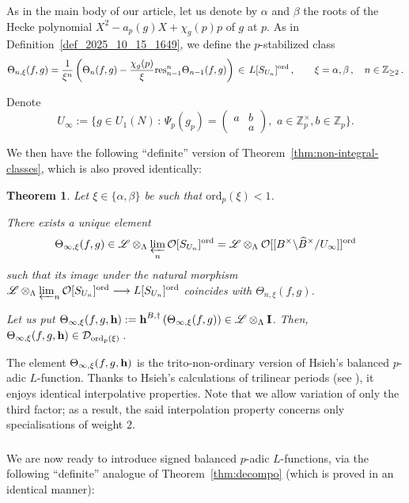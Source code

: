 \documentclass{amsart}
\numberwithin{equation}{section}
\newtheorem{theorem}{Theorem}[section]
\newcommand{\Zp}{\mathbb{Z}_p}
\newcommand{\ZZ}{\mathbb{Z}}
\newcommand{\ord}{\mathrm{ord}}
\newcommand{\cO}{\mathcal{O}}
\newcommand{\LL}{\Lambda}
\newcommand{\h}{\textup{\bf h}}
\newcommand{\lra}{\longrightarrow}
\newcommand{\res}{\textup{res}}
\begin{document}
\subsubsection{} As in the main body of our article, let us denote by $\alpha$ and $\beta$ the roots of the Hecke polynomial $X^2-a_p(g)X+\chi_g(p)p$ of $g$ at $p$. As in Definition~\ref{def_2025_10_15_1649}, we define the $p$-stabilized class 
$$\Theta_{n,\xi}(f,g)=\frac{1}{\xi^{n}}\left(\Theta_{n}(f,g)-\frac{\chi_g(p)}{\xi}\res_{n-1}^{n} \Theta_{n-1}(f,g)\right) \,\in\, L[S_{U_n}]^{\ord}\,,\qquad \xi=\alpha,\beta\,,\quad n\in \ZZ_{\geq 2}\,.$$ 

Denote \[ U_\infty :=\{ g \in U_1(N) \,:\, \Psi_p(g_p) = \left( \begin{smallmatrix} a & b  \\  & a \end{smallmatrix}\right),\,\,a \in\Zp^\times, b \in \ZZ_p\}. \] 

\noindent We then have the following ``definite'' version of Theorem~\ref{thm:non-integral-classes}, which is also proved identically:
\begin{theorem}
        \label{thm_2025_10_15_2117}
Let $\xi\in\{\alpha,\beta\}$ be such that $\ord_p(\xi)<1$. 
\item[i)] There exists a unique element 
$$\Theta_{\infty,\xi}(f,g)\in \mathscr{L}\otimes_\LL\varprojlim_n \cO[S_{U_n}]^{\ord}=\mathscr{L}\otimes_\LL \cO[[B^\times\backslash \widehat{B}^\times / U_\infty]]^{\ord}$$ 
such that its image under the natural morphism 
$ \mathscr{L}\otimes_{\LL}\varprojlim_n \cO[S_{U_n}]^{\ord} \lra L[S_{U_n}]^{\ord}$ coincides with $\Theta_{n,\xi}(f,g)$. 
\item[ii)] Let us put $\Theta_{\infty,\xi}(f,g,\h):=\h^{B, \dagger}\left(\Theta_{\infty,\xi}(f,g)\right)\in \mathscr{L}\otimes_\LL \mathbf{I}$. Then, $\Theta_{\infty,\xi}(f,g,\h) \in \mathcal{D}_{\ord_p(\xi)}$\,.
\end{theorem}
The element $\Theta_{\infty,\xi}(f,g,\h)$ is the trito-non-ordinary version of Hsieh's balanced $p$-adic $L$-function. Thanks to Hsieh's calculations of trilinear periods (see \cite[Propositions 4.9 \& 4.10, Corollary 4.13]{hsiehpadicbalanced}), it enjoys identical interpolative properties. Note that we allow variation of only the third factor; as a result, the said interpolation property concerns only specialisations of weight $2$.


\subsubsection{} We are now ready to introduce signed balanced $p$-adic $L$-functions, via the following ``definite'' analogue of Theorem~\ref{thm:decompo} (which is proved in an identical manner):
\end{document}
